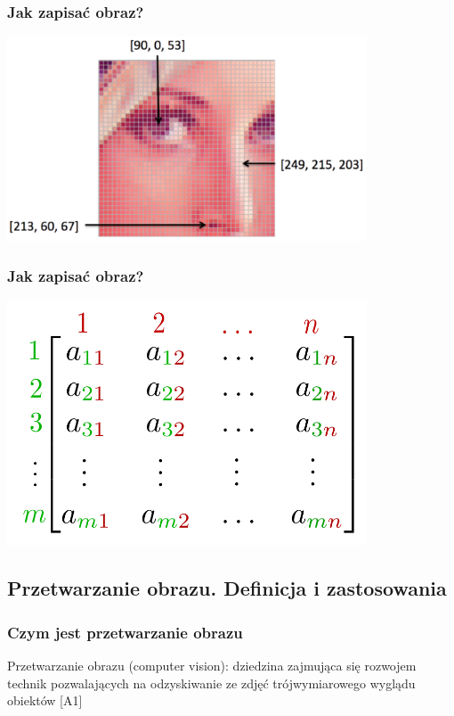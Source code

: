 \documentclass{beamer}
\begin{document}
            \begin{frame}
                \begin{center}
                    \frametitle{Jak zapisać obraz?}
                    \includegraphics[width=0.8\textwidth]{pictures/colorpixels.png}
                \end{center}
            \end{frame}

            \begin{frame}
                \begin{center}
                    \frametitle{Jak zapisać obraz?}
                    \includegraphics[width=0.8\textwidth]{pictures/matrix.png}
                \end{center}
            \end{frame}
        
        \subsection{Przetwarzanie obrazu. Definicja i zastosowania}

            \begin{frame}
                \frametitle{Czym jest przetwarzanie obrazu}
                Przetwarzanie obrazu (computer vision): dziedzina zajmująca się rozwojem technik pozwalających na odzyskiwanie ze zdjęć trójwymiarowego wyglądu obiektów [A1]
            \end{frame}
\end{document}

